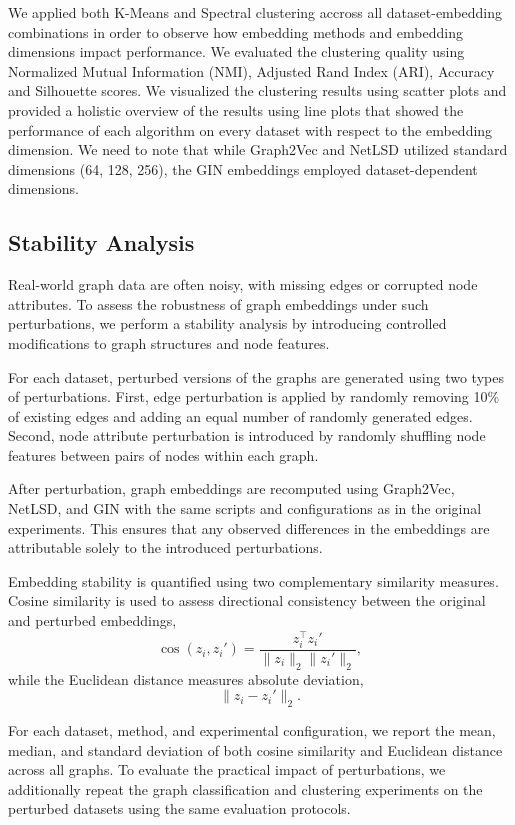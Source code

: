 We applied both K-Means and Spectral clustering accross all dataset-embedding
combinations in order to observe how embedding methods and embedding dimensions
impact performance. We evaluated the clustering quality using 
Normalized Mutual Information (NMI), Adjusted Rand Index (ARI), Accuracy 
and Silhouette scores. We visualized the clustering results using scatter plots
and provided a holistic overview  of the results using line plots that showed the 
performance of each algorithm on every dataset with respect to the embedding dimension.
We need to note that while Graph2Vec and NetLSD utilized standard dimensions (64, 128, 256), 
the GIN embeddings employed dataset-dependent dimensions.


\subsection{Stability Analysis}
Real-world graph data are often noisy, with missing edges or corrupted node attributes.
To assess the robustness of graph embeddings under such perturbations, we perform a
stability analysis by introducing controlled modifications to graph structures and
node features.

For each dataset, perturbed versions of the graphs are generated using two types of
perturbations.
First, edge perturbation is applied by randomly removing 10\% of existing edges and
adding an equal number of randomly generated edges.
Second, node attribute perturbation is introduced by randomly shuffling node features
between pairs of nodes within each graph.

After perturbation, graph embeddings are recomputed using Graph2Vec, NetLSD, and GIN
with the same scripts and configurations as in the original experiments.
This ensures that any observed differences in the embeddings are attributable solely
to the introduced perturbations.

Embedding stability is quantified using two complementary similarity measures.
Cosine similarity is used to assess directional consistency between the original and
perturbed embeddings,
\[
\cos (z_i, z_i') = \frac{z_i^\top z_i'}{\lVert z_i \rVert_2 \lVert z_i' \rVert_2},
\]
while the Euclidean distance measures absolute deviation,
\[
\lVert z_i - z_i' \rVert_2.
\]

For each dataset, method, and experimental configuration, we report the mean, median,
and standard deviation of both cosine similarity and Euclidean distance across all
graphs.
To evaluate the practical impact of perturbations, we additionally repeat the graph
classification and clustering experiments on the perturbed datasets using the same
evaluation protocols.
